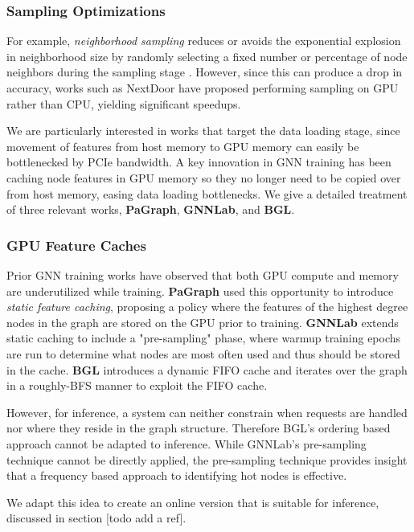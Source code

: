 \subsubsection{Sampling Optimizations}
For example, \textit{neighborhood sampling} reduces or avoids the exponential explosion in neighborhood size by randomly selecting a fixed number or percentage of node neighbors during the sampling stage \cite{GraphSAGE_2017}. 
However, since this can produce a drop in accuracy, works such as NextDoor \cite{NextDoor_2021} have proposed performing sampling on GPU rather than CPU, yielding significant speedups.

We are particularly interested in works that target the data loading stage, since movement of features from host memory to GPU memory can easily be bottlenecked by PCIe bandwidth.
A key innovation in GNN training has been caching node features in GPU memory so they no longer need to be copied over from host memory, easing data loading bottlenecks. We give a detailed treatment of three relevant works, \textbf{PaGraph}, \textbf{GNNLab}, and \textbf{BGL}.

\subsubsection{GPU Feature Caches}

Prior GNN training works have observed that both GPU compute and memory are underutilized while training. 
\textbf{PaGraph} \cite{PaGraph_2020} used this opportunity to introduce \textit{static feature caching}, proposing a policy where the features of the highest degree nodes in the graph are stored on the GPU prior to training. 
\textbf{GNNLab} \cite{GNNLab_2022} extends static caching to include a "pre-sampling" phase, where warmup training epochs are run to determine what nodes are most often used and thus should be stored in the cache.
\textbf{BGL} \cite{BGL_2023} introduces a dynamic FIFO cache and iterates over the graph in a roughly-BFS manner to exploit the FIFO cache.

However, for inference, a system can neither constrain when requests are handled nor where they reside in the graph structure. Therefore BGL's ordering based approach cannot be adapted to inference. While GNNLab's pre-sampling technique cannot be directly applied, the pre-sampling technique provides insight that a frequency based approach to identifying hot nodes is effective.

We adapt this idea to create an online version that is suitable for inference, discussed in section [todo add a ref].


